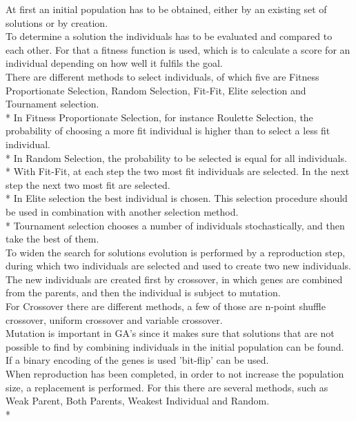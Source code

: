 At first an initial population has to be obtained, either by an existing set of solutions or by creation.\\
To determine a solution the individuals has to be evaluated and compared to each other. For that a fitness function is used, which is to calculate a score for an individual depending on how well it fulfils the goal.\\
There are different methods to select individuals, of which five are Fitness Proportionate Selection, Random Selection, Fit-Fit, Elite selection and Tournament selection.\\*
In Fitness Proportionate Selection, for instance Roulette Selection, the probability of choosing a more fit individual is higher than to select a less fit individual.\\*
In Random Selection, the probability to be selected is equal for all individuals. \\*
With Fit-Fit, at each step the two most fit individuals are selected. In the next step the next two most fit are selected.\\*
In Elite selection the best individual is chosen. This selection procedure should be used in combination with another selection method.\\*
Tournament selection chooses a number of individuals stochastically, and then take the best of them.\\
To widen the search for solutions evolution is performed by a reproduction step, during which two individuals are selected and used to create two new individuals. The new individuals are created first by crossover, in which genes are combined from the parents, and then the individual is subject to mutation.\\
For Crossover there are different methods, a few of those are n-point shuffle crossover, uniform crossover and variable crossover.\\
Mutation is important in GA's since it makes sure that solutions that are not possible to find by combining individuals in the initial population can be found. If a binary encoding of the genes is used 'bit-flip' can be used.\\
When reproduction has been completed, in order to not increase the population size, a replacement is performed. For this there are several methods, such as Weak Parent, Both Parents, Weakest Individual and Random.\\*
